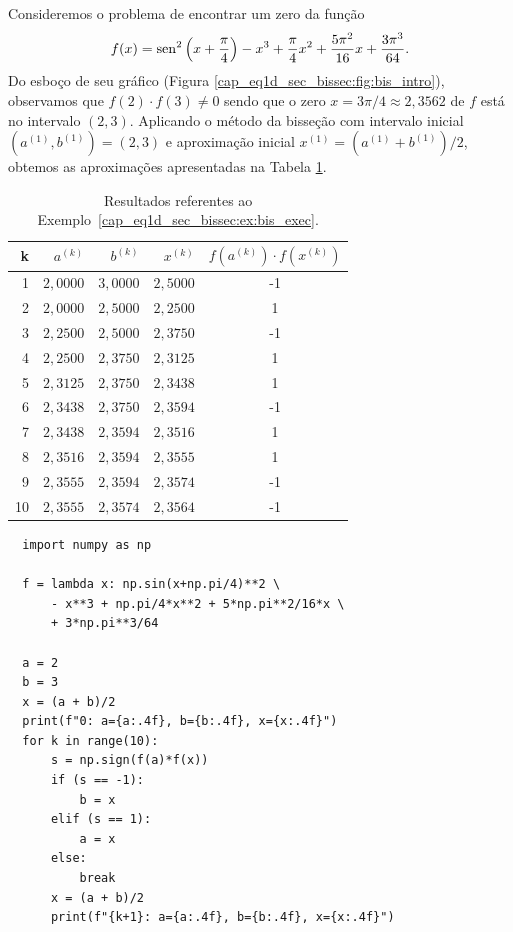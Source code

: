 \begin{ex}\label{cap_eq1d_sec_bissec:ex:bis_exec}
  Consideremos o problema de encontrar um zero da função
\begin{equation}
  f(x) = \operatorname{sen}^2\left(x+\frac{\pi}{4}\right) - x^3 + \frac{\pi}{4}x^2 + \frac{5\pi^2}{16}x + \frac{3\pi^3}{64}.
\end{equation}
Do esboço de seu gráfico (Figura \ref{cap_eq1d_sec_bissec:fig:bis_intro}), observamos que $f(2)\cdot f(3) \neq 0$ sendo que o zero $x=3\pi/4\approx 2,3562$ de $f$ está no intervalo $(2, 3)$. Aplicando o método da bisseção com intervalo inicial $(a^{(1)}, b^{(1)}) = (2, 3)$ e aproximação inicial $x^{(1)} = (a^{(1)}+b^{(1)})/2$, obtemos as aproximações apresentadas na Tabela \ref{cap_eq1d_sec_bissec:tab:bis_exec}.

\begin{table}[h!]
  \centering
  \caption{Resultados referentes ao Exemplo~\ref{cap_eq1d_sec_bissec:ex:bis_exec}.}
  \begin{tabular}{r|rr|r|c}
    k & $a^{(k)}$ & $b^{(k)}$ & $x^{(k)}$ & $f(a^{(k)})\cdot f(x^{(k)})$\\\hline
    1 & $2,0000$ & $3,0000$ & $2,5000$ & -1 \\
    2 & $2,0000$ & $2,5000$ & $2,2500$ &  1 \\
    3 & $2,2500$ & $2,5000$ & $2,3750$ & -1 \\
    4 & $2,2500$ & $2,3750$ & $2,3125$ & 1 \\
    5 & $2,3125$ & $2,3750$ & $2,3438$ & 1 \\
    6 & $2,3438$ & $2,3750$ & $2,3594$ &  -1 \\
    7 & $2,3438$ & $2,3594$ & $2,3516$ & 1 \\
    8 & $2,3516$ & $2,3594$ & $2,3555$ &  1 \\
    9 & $2,3555$ & $2,3594$ & $2,3574$ &  -1 \\
    10 & $2,3555$ & $2,3574$ & $2,3564$ & -1 \\\hline
  \end{tabular}
  \label{cap_eq1d_sec_bissec:tab:bis_exec}
\end{table}

\begin{lstlisting}
  import numpy as np

  f = lambda x: np.sin(x+np.pi/4)**2 \
      - x**3 + np.pi/4*x**2 + 5*np.pi**2/16*x \
      + 3*np.pi**3/64

  a = 2
  b = 3
  x = (a + b)/2
  print(f"0: a={a:.4f}, b={b:.4f}, x={x:.4f}")
  for k in range(10):
      s = np.sign(f(a)*f(x))
      if (s == -1):
          b = x
      elif (s == 1):
          a = x
      else:
          break
      x = (a + b)/2
      print(f"{k+1}: a={a:.4f}, b={b:.4f}, x={x:.4f}")
\end{lstlisting}
\end{ex}

